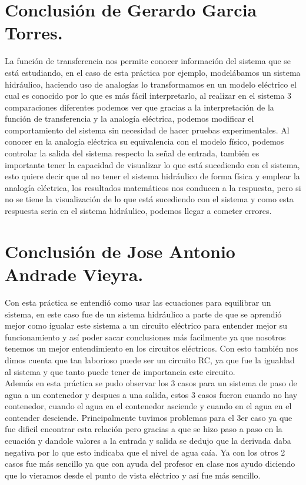 \documentclass[12pt,a4paper]{article}
\begin{document}
\newpage

\section{Conclusión de Gerardo Garcia Torres.}
La función de transferencia nos permite conocer información del sistema que se está estudiando, en el caso de esta práctica por ejemplo, modelábamos un sistema hidráulico, haciendo uso de analogías lo transformamos en un modelo eléctrico el cual es conocido por lo que es más fácil interpretarlo, al realizar en el sistema 3 comparaciones diferentes podemos ver que gracias a la interpretación de la función de transferencia y la analogía eléctrica, podemos modificar el comportamiento del sistema sin necesidad de hacer pruebas experimentales. Al conocer en la analogía eléctrica su equivalencia con el modelo físico, podemos controlar la salida del sistema respecto la señal de entrada, también es importante tener la capacidad de visualizar lo que está sucediendo con el sistema, esto quiere decir que al no tener el sistema hidráulico de forma física y emplear la analogía eléctrica, los resultados matemáticos nos conducen a la respuesta, pero si no se tiene la visualización de lo que está sucediendo con el sistema y como esta respuesta seria en el sistema hidráulico, podemos llegar a cometer errores.
\section{Conclusión de Jose Antonio Andrade Vieyra.}
Con esta práctica se entendió como usar las ecuaciones para equilibrar un sistema, en este caso fue de un sistema hidráulico a parte de que se aprendió mejor como igualar este sistema a un circuito eléctrico para entender mejor su funcionamiento y así poder sacar conclusiones más facilmente ya que nosotros tenemos un mejor entendimiento en los circuitos eléctricos. Con esto también nos dimos cuenta que tan laborioso puede ser un circuito RC, ya que fue la igualdad al sistema y que tanto puede tener de importancia este circuito.\\[12pt]
Además en esta práctica se pudo observar los 3 casos para un sistema de paso de agua a un contenedor y despues a una salida, estos 3 casos fueron cuando no hay contenedor, cuando el agua en el contenedor asciende y cuando en el agua en el contender desciende. Principalmente tuvimos problemas para el 3er caso ya que fue dificil encontrar esta relación pero gracias a que se hizo paso a paso en la ecuación y dandole valores a la entrada y salida se dedujo que la derivada daba negativa por lo que esto indicaba que el nivel de agua caía. Ya con los otros 2 casos fue más sencillo ya que con ayuda del profesor en clase nos ayudo diciendo que lo vieramos desde el punto de vista eléctrico y así fue más sencillo. 
\end{document}
